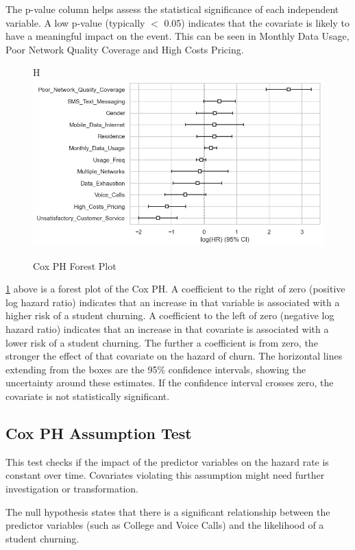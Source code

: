 \documentclass[doublespacing]{report} [12px]%
\begin{document}
The p-value column helps assess the statistical significance of each independent variable. A low p-value (typically  \(<\) 0.05) indicates that the covariate is likely to have a meaningful impact on the event. This can be seen in Monthly Data Usage, Poor Network Quality Coverage and High Costs Pricing.

\begin{figure}{H}
    \centering
    \includegraphics[width=1\linewidth]{Figure 4/4.2.png}
    \caption{Cox PH Forest Plot}
    \label{cox ph forest}
\end{figure}

\ref{cox ph forest} above is a forest plot of the Cox PH. A coefficient to the right of zero (positive log hazard ratio) indicates that an increase in that variable is associated with a higher risk of a student churning. A coefficient to the left of zero (negative log hazard ratio) indicates that an increase in that covariate is associated with a lower risk of a student churning.
The further a coefficient is from zero, the stronger the effect of that covariate on the hazard of churn.
The horizontal lines extending from the boxes are the 95\% confidence intervals, showing the uncertainty around these estimates. If the confidence interval crosses zero, the covariate is not statistically significant.

\subsection{Cox PH Assumption Test}
This test checks if the impact of the predictor variables on the hazard rate is constant over time. Covariates violating this assumption might need further investigation or transformation.	

The null hypothesis states that there is a significant relationship between the predictor variables (such as College and Voice Calls) and the likelihood of a student churning.
\end{document}
